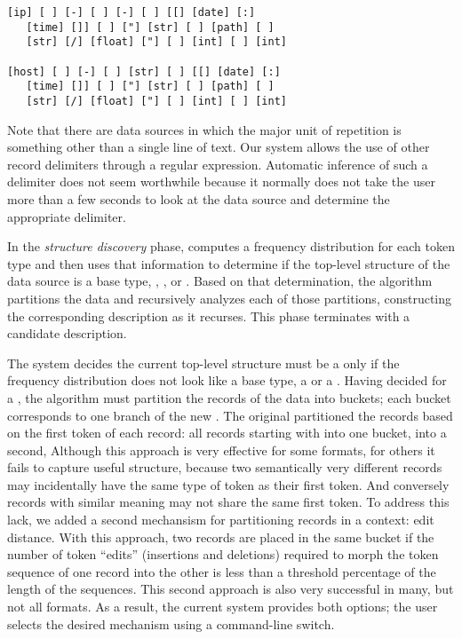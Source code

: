 {\small
\begin{verbatim}
[ip] [ ] [-] [ ] [-] [ ] [[] [date] [:] 
   [time] []] [ ] ["] [str] [ ] [path] [ ] 
   [str] [/] [float] ["] [ ] [int] [ ] [int]

[host] [ ] [-] [ ] [str] [ ] [[] [date] [:] 
   [time] []] [ ] ["] [str] [ ] [path] [ ] 
   [str] [/] [float] ["] [ ] [int] [ ] [int]
\end{verbatim}
}

Note that there are data sources in which the major unit of
repetition is something other than a single line of text. Our
system allows the use of other record delimiters through a
regular expression. Automatic inference of such a delimiter
does not seem worthwhile because it normally does not take
the user more than a few seconds to look at the data source and
determine the appropriate delimiter.

In the {\em structure discovery} phase, \learnpads{} computes a
frequency distribution for each token type and then uses that
information to determine if the top-level structure of the data source
is a base type, , , or .  Based on
that determination, the algorithm partitions the data 
and recursively analyzes each of those partitions, constructing
the corresponding description as it recurses.  This phase terminates
with a candidate description.  

The \learnpads{} system decides the current top-level structure must
be a  only if the frequency distribution does not look like
a base type, a  or a .  Having decided for a
, the algorithm must partition the records of the data into
buckets; each bucket corresponds to one branch of the new
.  The original \learnpads{} partitioned the records
based on the first token of each record: all records starting with
 into one bucket,  into a second, \etc{}  
Although this approach is very effective for some formats, for others
it fails to capture useful structure, because two semantically very
different records may incidentally have the same type of token as their first
token. And conversely records with similar meaning may not share the same
first token. To address this lack, we added
a second mechansism for partitioning records in a 
context: edit distance.  With this approach, two records are placed in
the same bucket if the number of token ``edits'' (insertions and
deletions) required to morph the token sequence of one record into the
other is less than a threshold percentage of the length of the
sequences.   This second approach is also very successful in many, but
not all formats.  As a result, the current \learnpads{} system
provides both options; the user selects the desired mechanism using a
command-line switch.


